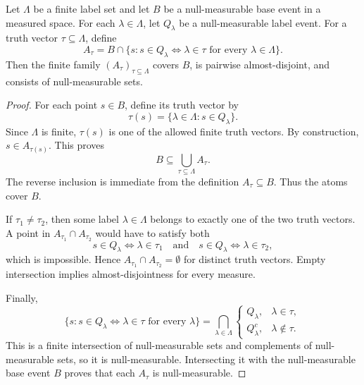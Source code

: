 \begin{lemma}
Let \(\Lambda\) be a finite label set and let \(B\) be a
null-measurable base event in a measured space.  For each
\(\lambda\in\Lambda\), let \(Q_\lambda\) be a null-measurable label event.
For a truth vector \(\tau\subseteq\Lambda\), define
\[
  A_\tau
  =
  B\cap
  \{s:s\in Q_\lambda\Longleftrightarrow \lambda\in\tau
       \text{ for every }\lambda\in\Lambda\}.
\]
Then the finite family \((A_\tau)_{\tau\subseteq\Lambda}\) covers \(B\), is
pairwise almost-disjoint, and consists of null-measurable sets.
\end{lemma}
\begin{proof}
For each point \(s\in B\), define its truth vector by
\[
  \tau(s)=\{\lambda\in\Lambda:s\in Q_\lambda\}.
\]
Since \(\Lambda\) is finite, \(\tau(s)\) is one of the allowed finite truth
vectors.  By construction, \(s\in A_{\tau(s)}\).  This proves
\[
  B\subseteq \bigcup_{\tau\subseteq\Lambda} A_\tau .
\]
The reverse inclusion is immediate from the definition \(A_\tau\subseteq B\).
Thus the atoms cover \(B\).

If \(\tau_1\ne\tau_2\), then some label
\(\lambda\in\Lambda\) belongs to exactly one of the two truth vectors.  A
point in \(A_{\tau_1}\cap A_{\tau_2}\) would have to satisfy both
\[
  s\in Q_\lambda\Longleftrightarrow \lambda\in\tau_1
  \quad\text{and}\quad
  s\in Q_\lambda\Longleftrightarrow \lambda\in\tau_2,
\]
which is impossible.  Hence \(A_{\tau_1}\cap A_{\tau_2}=\emptyset\) for
distinct truth vectors.  Empty intersection implies almost-disjointness for
every measure.

Finally,
\[
  \{s:s\in Q_\lambda\Longleftrightarrow \lambda\in\tau
       \text{ for every }\lambda\}
  =
  \bigcap_{\lambda\in\Lambda}
  \begin{cases}
    Q_\lambda, & \lambda\in\tau,\\
    Q_\lambda^c, & \lambda\notin\tau .
  \end{cases}
\]
This is a finite intersection of null-measurable sets and complements of
null-measurable sets, so it is null-measurable.  Intersecting it with the
null-measurable base event \(B\) proves that each \(A_\tau\) is
null-measurable.
\end{proof}
